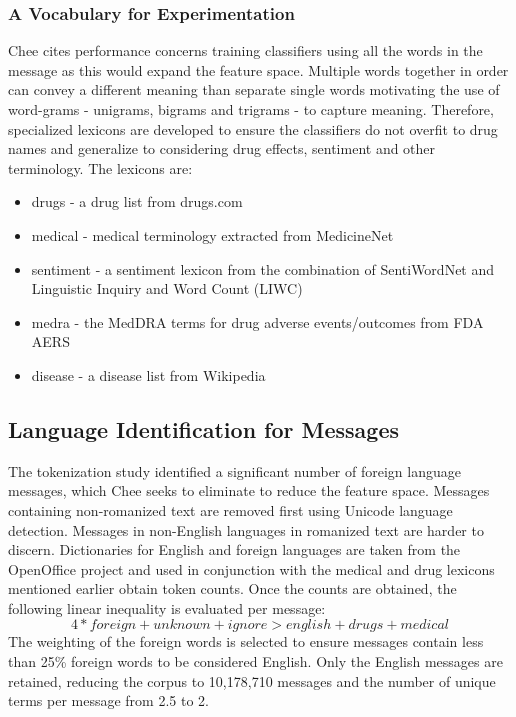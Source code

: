\documentclass[twoside,11pt]{article}
\begin{document}
\subsubsection{A Vocabulary for Experimentation}
Chee cites performance concerns training classifiers using all the words in the message as this would expand the feature space. Multiple words together in order can convey a different meaning than separate single words motivating the use of word-grams - unigrams, bigrams and trigrams - to capture meaning. Therefore, specialized lexicons are developed to ensure the classifiers do not overfit to drug names and generalize to considering drug effects, sentiment and other terminology. The lexicons are:
\begin{itemize}
  \item drugs - a drug list from drugs.com
  \item medical - medical terminology extracted from MedicineNet
  \item sentiment - a sentiment lexicon from the combination of SentiWordNet and Linguistic Inquiry and Word Count (LIWC)
  \item medra - the MedDRA terms for drug adverse events/outcomes from FDA AERS
  \item disease - a disease list from Wikipedia
\end{itemize}

\subsection{Language Identification for Messages}
The tokenization study identified a significant number of foreign language messages, which Chee seeks to eliminate to reduce the feature space. Messages containing non-romanized text are removed first using Unicode language detection. Messages in non-English languages in romanized text are harder to discern. Dictionaries for English and foreign languages are taken from the OpenOffice project and used in conjunction with the medical and drug lexicons mentioned earlier obtain token counts. Once the counts are obtained, the following linear inequality is evaluated per message:
\[
  4 * foreign + unknown + ignore > english + drugs + medical
\]
The weighting of the foreign words is selected to ensure messages contain less than 25\% foreign words to be considered English. Only the English messages are retained, reducing the corpus to 10,178,710 messages and the number of unique terms per message from 2.5 to 2. %
\end{document}
